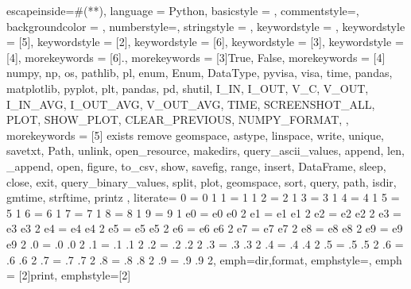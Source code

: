\newcommand\digitstyle{\color{numberLiteral}}
\makeatletter
\newcommand{\ProcessDigit}[1]
{%
	\ifnum\lst@mode=\lst@Pmode\relax%
		{\digitstyle #1}%
	\else
		#1%
	\fi
}

{
escapeinside={\#(*}{*)},
language = Python,
basicstyle = {\normalfont\scriptsize\ttfamily\color{variableAndParameterName}},
commentstyle=\color{comment},
backgroundcolor = {\color{back-color}},
numberstyle=\tiny\ttfamily\color{black},
stringstyle = {\color{stringLiteral}},
keywordstyle = {\color{controlFlowSpecialKeywords}},
keywordstyle = [5]{\color{functionDeclarations}},
keywordstyle = [2]{\color{functionDeclarations}},
keywordstyle = [6]{\color{black}},
keywordstyle = [3]{\color{constantLanguage}},
keywordstyle = [4]{\color{typesDeclarationAndReferences}}, %
morekeywords = [6]{.},
morekeywords = [3]{True, False},
morekeywords = [4]{
		numpy,
		np,
		os,
		pathlib,
		pl,
		enum,
		Enum,
		DataType,
		pyvisa,
		visa,
		time,
		pandas,
		matplotlib,
		pyplot,
		plt,
		pandas,
		pd,
		shutil,
		I\_IN,
		I\_OUT,
		V\_C,
		V\_OUT,
		I\_IN\_AVG,
		I\_OUT\_AVG,
		V\_OUT\_AVG,
		TIME,
		SCREENSHOT\_ALL,
		PLOT,
		SHOW\_PLOT,
		CLEAR\_PREVIOUS,
		NUMPY\_FORMAT,
	},%
morekeywords = [5]{
		exists
		remove
		geomspace,
		astype,
		linspace,
		write,
		unique,
		savetxt,
		Path,
		unlink,
		open\_resource,
		makedirs,
		query\_ascii\_values,
		append,
		len,
		\_append,
		open,
		figure,
		to\_csv,
		show,
		savefig,
		range,
		insert,
		DataFrame,
		sleep,
		close,
		exit,
		query\_binary\_values,
		split,
		plot,
		geomspace,
		sort,
		query,
		path,
		isdir,
		gmtime,
		strftime,
		printz
	},%
literate=
	{0}{{{\ProcessDigit{0}}}}1
{1}{{{\ProcessDigit{1}}}}1
{2}{{{\ProcessDigit{2}}}}1
{3}{{{\ProcessDigit{3}}}}1
{4}{{{\ProcessDigit{4}}}}1
{5}{{{\ProcessDigit{5}}}}1
{6}{{{\ProcessDigit{6}}}}1
{7}{{{\ProcessDigit{7}}}}1
{8}{{{\ProcessDigit{8}}}}1
{9}{{{\ProcessDigit{9}}}}1
{e0}{{{\ProcessDigit{e0}}}}2
{e1}{{{\ProcessDigit{e1}}}}2
{e2}{{{\ProcessDigit{e2}}}}2
{e3}{{{\ProcessDigit{e3}}}}2
{e4}{{{\ProcessDigit{e4}}}}2
{e5}{{{\ProcessDigit{e5}}}}2
{e6}{{{\ProcessDigit{e6}}}}2
{e7}{{{\ProcessDigit{e7}}}}2
{e8}{{{\ProcessDigit{e8}}}}2
{e9}{{{\ProcessDigit{e9}}}}2
{.0}{{{\ProcessDigit{.0}}}}2
{.1}{{{\ProcessDigit{.1}}}}2
{.2}{{{\ProcessDigit{.2}}}}2
{.3}{{{\ProcessDigit{.3}}}}2
{.4}{{{\ProcessDigit{.4}}}}2
{.5}{{{\ProcessDigit{.5}}}}2
{.6}{{{\ProcessDigit{.6}}}}2
{.7}{{{\ProcessDigit{.7}}}}2
{.8}{{{\ProcessDigit{.8}}}}2
{.9}{{{\ProcessDigit{.9}}}}2,
emph={dir,format},          %
emphstyle=\color{variableAndParameterName},
emph = [2]{print},
emphstyle=[2]{\color{functionDeclarations}}
}

